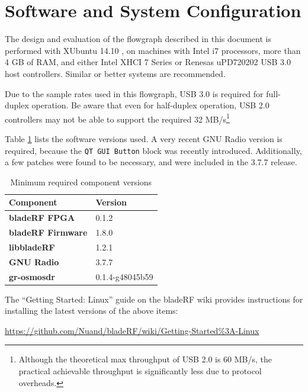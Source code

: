 \newpage
\section{Software and System Configuration} \label{sec:sys_config}

The design and evaluation of the flowgraph described in this document is
performed with XUbuntu 14.10 \cite{XUBUNTU}, on machines with Intel i7
processors, more than 4 GB of RAM, and either Intel XHCI 7 Series or Renesas
uPD720202 USB 3.0 host controllers. Similar or better systems are recommended.

Due to the sample rates used in this flowgraph, USB 3.0 is required for
full-duplex operation. Be aware that even for half-duplex operation, USB 2.0
controllers may not be able to support the required 32 MB/s\footnote{Although
the theoretical max throughput of USB 2.0 is 60 MB/s, the practical achievable
throughput is significantly less due to protocol overheads.}

Table \ref{tab:versions} lists the software versions used. A very recent GNU
Radio version is required, because the \texttt{QT GUI Button} block was
recently introduced. Additionally, a few patches were found to be necessary,
and were included in the 3.7.7 release.

\begin{table}[h]
  \centering
  \caption{Minimum required component versions}
  \label{tab:versions}
  \footnotesize
  \begin{tabular} {|l|l|}
    \hline
    \textbf{Component}                   & \textbf{Version} \\ \hline
    \hline
    \textbf{bladeRF FPGA}               & 0.1.2             \\ \hline
    \textbf{bladeRF Firmware}           & 1.8.0             \\ \hline
    \textbf{libbladeRF}                 & 1.2.1             \\ \hline
    \textbf{GNU Radio}                  & 3.7.7             \\ \hline
    \textbf{gr-osmosdr}                 & 0.1.4-g48045b59   \\ \hline
  \end{tabular}
\end{table}

The ``Getting Started: Linux'' guide on the bladeRF wiki provides instructions
for installing the latest versions of the above items: \\
\begin{center}
  \footnotesize
  \url{https://github.com/Nuand/bladeRF/wiki/Getting-Started%3A-Linux}
\end{center}


